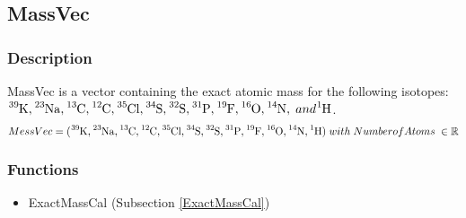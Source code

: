 \subsection{MassVec}\label{MassVec}
\subsubsection{Description}
MassVec is a vector containing the exact atomic mass for the following isotopes: $\ce{^{39}K}, \ce{^{23}Na}, \ce{^{13}C}, \ce{^{12}C}, \ce{^{35}Cl}, \ce{^{34}S}, \ce{^{32}S}, \ce{^{31}P}, \ce{^{19}F}, \ce{^{16}O}, \ce{^{14}N}, \; and \ce{^{1}H}$.
\begin{equation}
MessVec=(\ce{^{39}K}, \ce{^{23}Na}, \ce{^{13}C}, \ce{^{12}C}, \ce{^{35}Cl}, \ce{^{34}S}, \ce{^{32}S}, \ce{^{31}P}, \ce{^{19}F}, \ce{^{16}O}, \ce{^{14}N}, \ce{^{1}H}) \; with \; NumberofAtoms \;\in \mathbb{R}
\end{equation}
\subsubsection{Functions}
\begin{itemize}
\item ExactMassCal (Subsection \ref{ExactMassCal})
\end{itemize}

